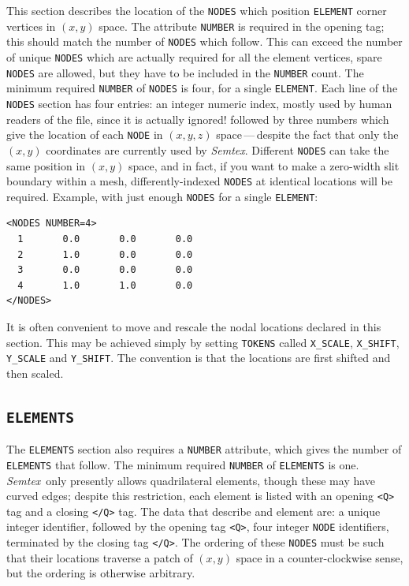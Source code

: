 \documentclass[11pt]{report}
\newcommand{\Semtex}{\emph{Semtex}} \newcommand{\Dog}{\emph{Dog}}
\begin{document}
This section describes the location of the \verb|NODES| which position
\verb|ELEMENT| corner vertices in $(x,y)$ space.  The attribute
\verb|NUMBER| is required in the opening tag; this should match the
number of \verb|NODES| which follow.  This can exceed the number of
unique \verb|NODES| which are actually required for all the element
vertices, \ie spare \verb|NODES| are allowed, but they have to be
included in the \verb|NUMBER| count. The minimum required
\verb|NUMBER| of \verb|NODES| is four, \ie for a single
\verb|ELEMENT|.  Each line of the \verb|NODES| section has four
entries: an integer numeric index, mostly used by human readers of the
file, since it is actually ignored!  followed by three numbers which
give the location of each \verb|NODE| in $(x,y,z)$ space\,---\,despite
the fact that only the $(x,y)$ coordinates are currently used by
\Semtex.  Different \verb|NODES| can take the same position in $(x,y)$
space, and in fact, if you want to make a zero-width slit boundary
within a mesh, differently-indexed \verb|NODES| at identical locations
will be required.  Example, with just enough \verb|NODES| for a single
\verb|ELEMENT|:
%
{\small
\begin{verbatim}
<NODES NUMBER=4>
  1       0.0       0.0       0.0
  2       1.0       0.0       0.0
  3       0.0       0.0       0.0
  4       1.0       1.0       0.0
</NODES>
\end{verbatim}
}
%
It is often convenient to move and rescale the nodal locations
declared in this section. This may be achieved simply by setting
\verb|TOKENS| called \verb|X_SCALE|, \verb|X_SHIFT|, \verb|Y_SCALE|
and \verb|Y_SHIFT|.  The convention is that the locations are first
shifted and then scaled.

\subsection{\texttt{ELEMENTS}}
\label{sec.elements}

The \verb|ELEMENTS| section also requires a \verb|NUMBER| attribute,
which gives the number of \verb|ELEMENTS| that follow.  The minimum
required \verb|NUMBER| of \verb|ELEMENTS| is one.  \Semtex\ only
presently allows quadrilateral elements, though these may have curved
edges; despite this restriction, each element is listed with an
opening \verb|<Q>| tag and a closing \verb|</Q>| tag.  The data that
describe and element are: a unique integer identifier, followed by the
opening tag \verb|<Q>|, four integer \verb|NODE| identifiers,
terminated by the closing tag \verb|</Q>|.  The ordering of these
\verb|NODES| must be such that their locations traverse a patch of
$(x,y)$ space in a counter-clockwise sense, but the ordering is
otherwise arbitrary.
\end{document}
